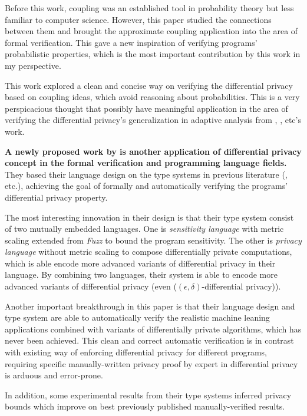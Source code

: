 \documentclass{article}
\begin{document}
Before this work, coupling was an established tool in probability theory but less familiar to computer science. However, this paper studied the connections between them and brought the approximate coupling application into the area of formal verification. This gave a new inspiration of verifying programs' probabilistic properties, which is the most important contribution by this work in my perspective. 

This work explored a clean and concise way on verifying the differential privacy based on coupling ideas, which avoid reasoning about probabilities. This is a very perspicacious thought that possibly have meaningful application in the area of verifying the differential privacy's generalization in adaptive analysis from \cite{dwork2015generalization}, \cite{smith2017information}, \cite{bassily2016algorithmic} etc's work.


\textbf{A newly proposed work by \cite{near2019duet} is another application of differential privacy concept in the formal verification and programming language fields.} They based their language design on the type systems in previous literature (\cite{gaboardi2013linear}, \cite{reed2010distance} etc.), achieving the goal of formally and automatically verifying the programs' differential privacy property.

The most interesting innovation in their design is that their type system consist of two mutually embedded languages. One is \emph{sensitivity language} with metric scaling extended from \emph{Fuzz} \cite{reed2010distance} to bound the program sensitivity. The other is \emph{privacy language} without metric scaling to compose differentially private computations, which is able encode more advanced variants of differential privacy in their language. By combining two languages, their system is able to encode more advanced variants of differential privacy (even ($(\epsilon, \delta)$-differential privacy)).

Another important breakthrough in this paper is that their language design and type system are able to automatically verify the realistic machine leaning applications combined with variants of differentially private algorithms, which has never been achieved.
This clean and correct automatic verification is in contrast with existing way of enforcing differential privacy for different programs, requiring specific manually-written privacy proof by expert in differential privacy is arduous and error-prone.

In addition, some experimental results from their type systems inferred privacy bounds which improve on best previously published manually-verified results.
\end{document}
